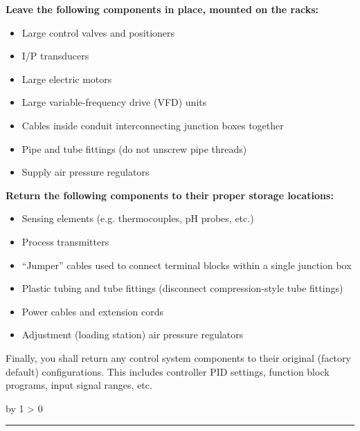 \documentclass[12pt,a4paper]{article}
\def\svar{
           \advance\answnum by 1
           \ifnum \answnum > 0
                \hrule
                \vskip 3pt
                \leftline{Svar \the\answnum}
                \vskip 3pt \fi}
\begin{document}
\begin{itemize}
\vskip 10pt

\indent
{\bf Leave the following components in place, mounted on the racks:}

\begin{itemize}
\item{} Large control valves and positioners
\item{} I/P transducers
\item{} Large electric motors
\item{} Large variable-frequency drive (VFD) units
\item{} Cables inside conduit interconnecting junction boxes together
\item{} Pipe and tube fittings (do not unscrew pipe threads)
\item{} Supply air pressure regulators
\end{itemize}

\vskip 10pt

\indent
{\bf Return the following components to their proper storage locations:}

\begin{itemize}
\item{} Sensing elements (e.g. thermocouples, pH probes, etc.)
\item{} Process transmitters
\item{} ``Jumper'' cables used to connect terminal blocks within a single junction box
\item{} Plastic tubing and tube fittings (disconnect compression-style tube fittings)
\item{} Power cables and extension cords
\item{} Adjustment (loading station) air pressure regulators
\end{itemize}

\vskip 10pt

Finally, you shall return any control system components to their original (factory default) configurations.  This includes controller PID settings, function block programs, input signal ranges, etc.





\vskip 10pt \filbreak 





\svar{} 


\vskip 10pt \filbreak 






\end{itemize}
\end{document}
